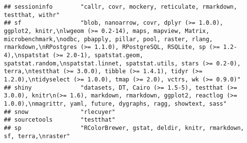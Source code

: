 \documentclass[
]{article}
\begin{document}
\begin{verbatim}
## sessioninfo        "callr, covr, mockery, reticulate, rmarkdown, testthat, withr"                                                                                                                                                                                                                                                                                                                                                                                                                    
## sf                 "blob, nanoarrow, covr, dplyr (>= 1.0.0), ggplot2, knitr,\nlwgeom (>= 0.2-14), maps, mapview, Matrix, microbenchmark,\nodbc, pbapply, pillar, pool, raster, rlang, rmarkdown,\nRPostgres (>= 1.1.0), RPostgreSQL, RSQLite, sp (>= 1.2-4),\nspatstat (>= 2.0-1), spatstat.geom, spatstat.random,\nspatstat.linnet, spatstat.utils, stars (>= 0.2-0), terra,\ntestthat (>= 3.0.0), tibble (>= 1.4.1), tidyr (>= 1.2.0),\ntidyselect (>= 1.0.0), tmap (>= 2.0), vctrs, wk (>= 0.9.0)"
## shiny              "datasets, DT, Cairo (>= 1.5-5), testthat (>= 3.0.0), knitr\n(>= 1.6), markdown, rmarkdown, ggplot2, reactlog (>= 1.0.0),\nmagrittr, yaml, future, dygraphs, ragg, showtext, sass"                                                                                                                                                                                                                                                                                                
## snow               "rlecuyer"                                                                                                                                                                                                                                                                                                                                                                                                                                                                        
## sourcetools        "testthat"                                                                                                                                                                                                                                                                                                                                                                                                                                                                        
## sp                 "RColorBrewer, gstat, deldir, knitr, rmarkdown, sf, terra,\nraster"                                                                                                                                                                                                                                                                                                                                                                                                               

\end{verbatim}
\end{document}
